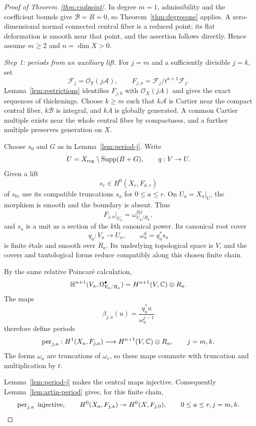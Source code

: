 \documentclass[11pt,a4paper]{article}
\numberwithin{equation}{section}
\theoremstyle{definition}
\theoremstyle{remark}
\newcommand{\C}{\mathbb C}\newcommand{\Z}{\mathbb Z}
\newcommand{\OO}{\mathcal O}\newcommand{\cX}{\mathcal X}
\newcommand{\cY}{\mathcal Y}\newcommand{\cB}{\mathcal B}
\newcommand{\cA}{\mathcal A}\newcommand{\cF}{\mathcal F}
\newcommand{\Supp}{\operatorname{Supp}}\newcommand{\Sing}{\operatorname{Sing}}
\begin{document}
\begin{proof}[Proof of Theorem~\ref{thm:endpoint}]
In degree $m=1$, admissibility and the coefficient bounds give
$\cB=B=0$, so Theorem~\ref{thm:degreeone} applies. A
zero-dimensional normal connected central fiber is a reduced point;
its flat deformation is smooth near that point, and the assertion
follows directly. Hence assume $m\ge2$ and $n=\dim X>0$.

\emph{Step 1: periods from an auxiliary lift.}
For $j=m$ and a sufficiently divisible $j=k$, set
\[
 \cF_j=\OO_{\cY}(j\cA),\qquad F_{j,a}=\cF_j/t^{a+1}\cF_j.
\]
Lemma~\ref{lem:restrictions} identifies $F_{j,0}$ with $\OO_X(jA)$
and gives the exact sequences of thickenings. Choose $k\ge m$ such
that $k\cA$ is Cartier near the compact central fiber, $k\cB$ is integral, and $kA$
is globally generated. A common Cartier multiple exists near the
whole central fiber by compactness, and a further multiple preserves
generation on $X$.

Choose $s_0$ and $G$ as in Lemma~\ref{lem:period-j}. Write
\[
 U=X_{\reg}\setminus\Supp(B+G),\qquad q:V\to U.
\]
Given a lift
\begin{equation}\label{eq:existing-lift}
 s_r\in H^0(X_r,F_{k,r})
\end{equation}
of $s_0$, use its compatible truncations $s_a$ for
$0\le a\le r$. On $U_a=X_a|_U$, the morphism is smooth and the
boundary is absent. Thus
\[
 F_{j,a}|_{U_a}=\omega_{U_a/R_a}^{\otimes j},
\]
and $s_a$ is a unit as a section of the $k$th canonical power. Its
canonical root cover
\[
 q_a:V_a\longrightarrow U_a,\qquad \omega_a^k=q_a^*s_a
\]
is finite étale and smooth over $R_a$. Its underlying topological
space is $V$, and the covers and tautological forms reduce compatibly
along this chosen finite chain.

By the same relative Poincaré calculation,
\[
 \HH^{n+1}(V_a,\Omega^\bullet_{V_a/R_a})
 =H^{n+1}(V,\C)\otimes R_a.
\]
The maps
\[
 \beta_{j,a}(u)=\frac{q_a^*u}{\omega_a^{j-1}}
\]
therefore define periods
\begin{equation}\label{eq:artin-periods}
 \per_{j,a}:H^1(X_a,F_{j,a})
 \longrightarrow H^{n+1}(V,\C)\otimes R_a,\qquad j=m,k.
\end{equation}
The forms $\omega_a$ are truncations of $\omega_r$, so these maps
commute with truncation and multiplication by $t$.

Lemma~\ref{lem:period-j} makes the central maps injective. Consequently
Lemma~\ref{lem:artin-period} gives, for this finite chain,
\begin{equation}\label{eq:period-and-sections}
 \operatorname{per}_{j,a}\text{ injective},\qquad
 H^0(X_a,F_{j,a})\twoheadrightarrow H^0(X,F_{j,0}),
 \qquad 0\le a\le r, j=m,k.
\end{equation}


\end{proof}
\end{document}
